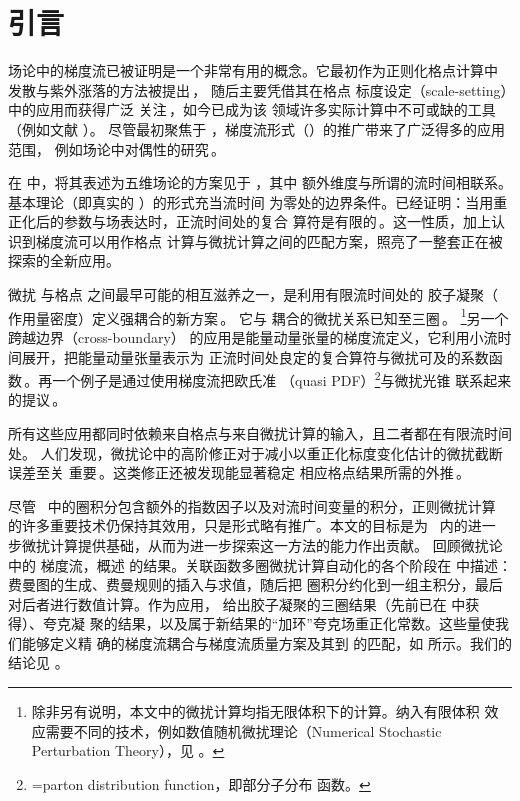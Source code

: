 \section{引言}\label{sec:intro}

场论中的梯度流已被证明是一个非常有用的概念。它最初作为正则化格点计算中
发散与紫外涨落的方法被提出\,\cite{Narayanan:2006rf,Luscher:2009eq}，
随后主要凭借其在格点 \qcd{} 标度设定（scale-setting）中的应用而获得广泛
关注\,\cite{Luscher:2010iy,Luscher:2013vga,Borsanyi:2012zs}，如今已成为该
领域许多实际计算中不可或缺的工具（例如文献
）。
尽管最初聚焦于 \qcd{}，梯度流形式（\gff）的推广带来了广泛得多的应用范围，
例如场论中对偶性的研究\,\cite{Aoki:2015dla,Aoki:2016ohw,Aoki:2017uce,Aoki:2017bru,
  Aoki:2018dmc,Aoki:2019bfb}。

在 \qcd{} 中，将其表述为五维场论的方案见于 ，其中
额外维度与所谓的流时间相联系。基本理论（即真实的 \qcd{}）的形式充当流时间
为零处的边界条件。已经证明：当用重正化后的参数与场表达时，正流时间处的复合
算符是有限的\,\cite{Luscher:2011bx}。这一性质，加上认识到梯度流可以用作格点
计算与微扰计算之间的匹配方案，照亮了一整套正在被探索的全新应用。

微扰 \qcd{} 与格点 \qcd{} 之间最早可能的相互滋养之一，是利用有限流时间处的
胶子凝聚（\qcd{} 作用量密度）定义强耦合的新方案\,\cite{Luscher:2010iy}。
它与 \msbar{} 耦合的微扰关系已知至三圈\,\cite{Harlander:2016vzb}。
\footnote{除非另有说明，本文中的微扰计算均指无限体积下的计算。纳入有限体积
效应需要不同的技术，例如数值随机微扰理论（Numerical Stochastic Perturbation
Theory），见 。}另一个跨越边界（cross-boundary）
的应用是能量动量张量的梯度流定义，它利用小流时间展开，把能量动量张量表示为
正流时间处良定的复合算符与微扰可及的系数函数\,\cite{Suzuki:2013gza,Makino:2014taa,
  Harlander:2018zpi,Iritani:2018idk}。再一个例子是通过使用梯度流把欧氏准
\pdf{}（quasi PDF）\footnote{\pdf=parton distribution function，即部分子分布
函数。}与微扰光锥 \pdf{} 联系起来的提议\,\cite{Monahan:2016bvm,Monahan:2017hpu}。

所有这些应用都同时依赖来自格点与来自微扰计算的输入，且二者都在有限流时间处。
人们发现，微扰论中的高阶修正对于减小以重正化标度变化估计的微扰截断误差至关
重要\,\cite{Harlander:2016vzb,Harlander:2018zpi}。这类修正还被发现能显著稳定
相应格点结果所需的外推\,\cite{Iritani:2018idk}。

尽管 \gff\ 中的圈积分包含额外的指数因子以及对流时间变量的积分，正则微扰计算
的许多重要技术仍保持其效用，只是形式略有推广。本文的目标是为 \gff\ 内的进一
步微扰计算提供基础，从而为进一步探索这一方法的能力作出贡献。
回顾微扰论中的 \qcd{} 梯度流，概述  的结果。关联函数多圈微扰计算自动化的各个阶段在
 中描述：费曼图的生成、费曼规则的插入与求值，随后把
圈积分约化到一组主积分，最后对后者进行数值计算。作为应用，
给出胶子凝聚的三圈结果（先前已在  中获得）、夸克凝
聚的结果，以及属于新结果的``加环''夸克场重正化常数。这些量使我们能够定义精
确的梯度流耦合与梯度流质量方案及其到 \msbar{} 的匹配，如 
所示。我们的结论见 。
